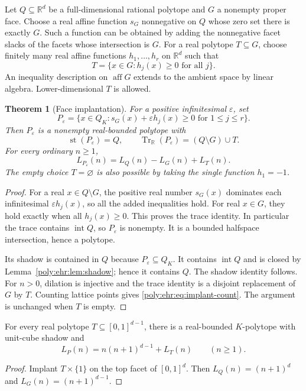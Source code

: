 \documentclass[11pt,a4paper]{article}
\numberwithin{equation}{section}
\newtheorem{theorem}{Theorem}[section]
\theoremstyle{plain}
\newcommand{\R}{\mathbb R}
\newcommand{\eps}{\varepsilon}
\newcommand{\st}{\operatorname{st}}
\newcommand{\aff}{\operatorname{aff}}
\newcommand{\intr}{\operatorname{int}}
\newcommand{\Tr}{\operatorname{Tr}_{\R}}%
\newcommand{\tr}{\operatorname{tr}}%
\begin{document}
Let $Q\subseteq\R^d$ be a full-dimensional rational polytope and $G$ a
nonempty proper face. Choose a real affine function $s_G$ nonnegative on
$Q$ whose zero set there is exactly $G$. Such a function can be obtained by
adding the nonnegative facet slacks of the facets whose intersection is
$G$. For a real polytope $T\subseteq G$, choose finitely many real affine
functions $h_1,\ldots,h_r$ on $\R^d$ such that
\[
 T=\{x\in G:h_j(x)\geq0\text{ for all }j\}.
\]
An inequality description on $\aff G$ extends to the ambient space by
linear algebra. Lower-dimensional $T$ is allowed.

\begin{theorem}[Face implantation]\label{poly:ehr:thm:implant}
For a positive infinitesimal $\eps$, set
\begin{equation}\label{poly:ehr:eq:implant}
 P_\eps=\{x\in Q_K:s_G(x)+\eps h_j(x)\geq0\text{ for }1\leq j\leq r\}.
\end{equation}
Then $P_\eps$ is a nonempty real-bounded polytope with
\begin{equation}\label{poly:ehr:eq:implant-trace}
 \st(P_\eps)=Q,\qquad
 \Tr(P_\eps)=(Q\setminus G)\cup T.
\end{equation}
For every ordinary $n\geq1$,
\begin{equation}\label{poly:ehr:eq:implant-count}
 L_{P_\eps}(n)=L_Q(n)-L_G(n)+L_T(n).
\end{equation}
The empty choice $T=\varnothing$ is also possible by taking the single
function $h_1=-1$.
\end{theorem}
\begin{proof}
For a real $x\in Q\setminus G$, the positive real number $s_G(x)$
dominates each infinitesimal $\eps h_j(x)$, so all the added inequalities
hold. For real $x\in G$, they hold exactly when all $h_j(x)\geq0$.
This proves the trace identity. In particular the trace contains
$\intr Q$, so $P_\eps$ is nonempty. It is a bounded halfspace intersection,
hence a polytope.

Its shadow is contained in $Q$ because $P_\eps\subseteq Q_K$. It contains
$\intr Q$ and is closed by Lemma~\ref{poly:ehr:lem:shadow}; hence it contains $Q$.
The shadow identity follows. For $n>0$, dilation is injective and the trace
identity is a disjoint replacement of $G$ by $T$. Counting lattice points
gives \eqref{poly:ehr:eq:implant-count}. The argument is unchanged when $T$ is empty.
\end{proof}

\begin{corollary}\label{poly:ehr:cor:cube}
For every real polytope $T\subseteq[0,1]^{d-1}$, there is a real-bounded
$K$-polytope with unit-cube shadow and
\begin{equation}\label{poly:ehr:eq:cube}
 L_P(n)=n(n+1)^{d-1}+L_T(n)\qquad(n\geq1).
\end{equation}
\end{corollary}
\begin{proof}
Implant $T\times\{1\}$ on the top facet of $[0,1]^d$.
Then $L_Q(n)=(n+1)^d$ and $L_G(n)=(n+1)^{d-1}$.
\end{proof}
\end{document}
